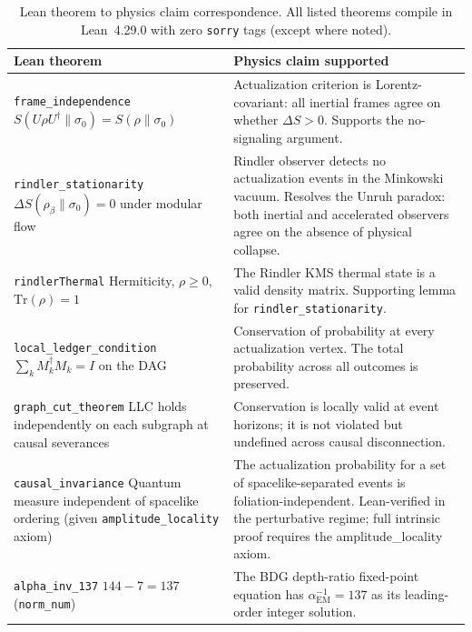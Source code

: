 \documentclass[11pt,a4paper]{article}
\theoremstyle{plain}
\theoremstyle{definition}
\theoremstyle{remark}
\begin{document}
\begin{table}[ht]
\centering
\small
\caption{Lean theorem to physics claim correspondence.
  All listed theorems compile in Lean~4.29.0 with zero \texttt{sorry} tags
  (except where noted).}
\label{tab:lean_map}
\begin{tabular}{p{4.5cm}p{7cm}}
\toprule
\textbf{Lean theorem} & \textbf{Physics claim supported} \\
\midrule
\texttt{frame\_independence} \newline
$S(U\rho U^\dagger\|\sigma_0) = S(\rho\|\sigma_0)$ &
Actualization criterion is Lorentz-covariant: all inertial frames agree on
whether $\Delta S > 0$. Supports the no-signaling argument. \\[4pt]

\texttt{rindler\_stationarity} \newline
$\Delta S(\rho_\beta\|\sigma_0) = 0$ under modular flow &
Rindler observer detects no actualization events in the Minkowski vacuum.
Resolves the Unruh paradox: both inertial and accelerated observers agree
on the absence of physical collapse. \\[4pt]

\texttt{rindlerThermal} \newline
Hermiticity, $\rho \geq 0$, $\mathrm{Tr}(\rho) = 1$ &
The Rindler KMS thermal state is a valid density matrix. Supporting
lemma for \texttt{rindler\_stationarity}. \\[4pt]

\texttt{local\_ledger\_condition} \newline
$\sum_k M_k^\dagger M_k = I$ on the DAG & 
Conservation of probability at every actualization vertex.
The total probability across all outcomes is preserved. \\[4pt]

\texttt{graph\_cut\_theorem} \newline
LLC holds independently on each subgraph at causal severances &
Conservation is locally valid at event horizons; it is not violated
but undefined across causal disconnection. \\[4pt]

\texttt{causal\_invariance} \newline
Quantum measure independent of spacelike ordering
(given \texttt{amplitude\_locality} axiom) &
The actualization probability for a set of spacelike-separated events
is foliation-independent. Lean-verified in the perturbative regime;
full intrinsic proof requires the amplitude\_locality axiom. \\[4pt]

\texttt{alpha\_inv\_137} \newline
$144 - 7 = 137$ (\texttt{norm\_num}) &
The BDG depth-ratio fixed-point equation has $\alpha_{\mathrm{EM}}^{-1} = 137$
as its leading-order integer solution. \\
\bottomrule
\end{tabular}
\end{table}
\end{document}
